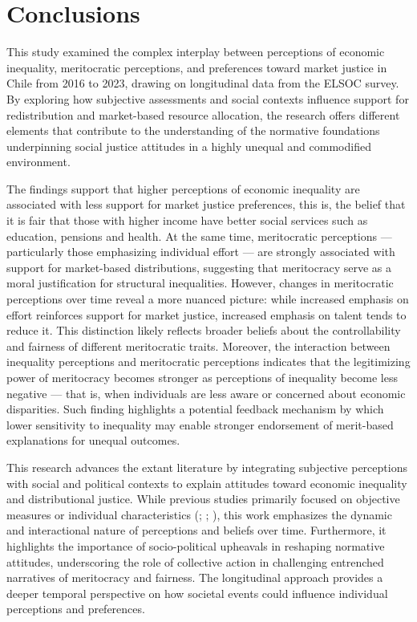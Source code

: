 \documentclass[
  12pt,
]{article}
\begin{document}
\section{Conclusions}\label{conclusions}

This study examined the complex interplay between perceptions of
economic inequality, meritocratic perceptions, and preferences toward
market justice in Chile from 2016 to 2023, drawing on longitudinal data
from the ELSOC survey. By exploring how subjective assessments and
social contexts influence support for redistribution and market-based
resource allocation, the research offers different elements that
contribute to the understanding of the normative foundations
underpinning social justice attitudes in a highly unequal and
commodified environment.

The findings support that higher perceptions of economic inequality are
associated with less support for market justice preferences, this is,
the belief that it is fair that those with higher income have better
social services such as education, pensions and health. At the same
time, meritocratic perceptions --- particularly those emphasizing
individual effort --- are strongly associated with support for
market-based distributions, suggesting that meritocracy serve as a moral
justification for structural inequalities. However, changes in
meritocratic perceptions over time reveal a more nuanced picture: while
increased emphasis on effort reinforces support for market justice,
increased emphasis on talent tends to reduce it. This distinction likely
reflects broader beliefs about the controllability and fairness of
different meritocratic traits. Moreover, the interaction between
inequality perceptions and meritocratic perceptions indicates that the
legitimizing power of meritocracy becomes stronger as perceptions of
inequality become less negative --- that is, when individuals are less
aware or concerned about economic disparities. Such finding highlights a
potential feedback mechanism by which lower sensitivity to inequality
may enable stronger endorsement of merit-based explanations for unequal
outcomes.

This research advances the extant literature by integrating subjective
perceptions with social and political contexts to explain attitudes
toward economic inequality and distributional justice. While previous
studies primarily focused on objective measures or individual
characteristics (;
;
), this work emphasizes the
dynamic and interactional nature of perceptions and beliefs over time.
Furthermore, it highlights the importance of socio-political upheavals
in reshaping normative attitudes, underscoring the role of collective
action in challenging entrenched narratives of meritocracy and fairness.
The longitudinal approach provides a deeper temporal perspective on how
societal events could influence individual perceptions and preferences.
\end{document}
